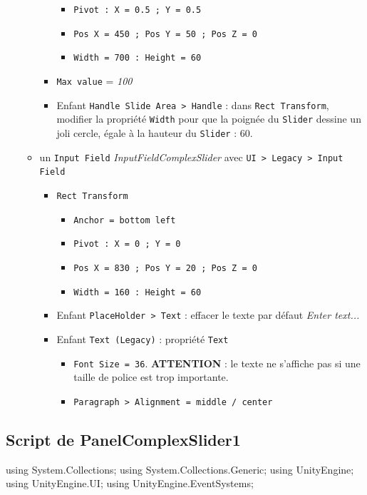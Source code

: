 \documentclass[a4paper,10pt]{article}
\newenvironment{solution}%
{\begin{tcolorbox}[breakable,colback=red!5!white,colframe=red!75!black,title=Solution]}%
{\end{tcolorbox}}
\newenvironment{boxcode}%
{\begin{tcolorbox}[breakable,colback=gray!5!white,colframe=black]}%
	{\end{tcolorbox}}
\begin{document}
\begin{solution}
\begin{itemize}
\begin{itemize}
\begin{itemize}
\begin{itemize}
				\item \texttt{Pivot : X = 0.5 ; Y = 0.5}
				\item \texttt{Pos X = 450 ; Pos Y = 50 ; Pos Z = 0}
				\item \texttt{Width = 700 : Height = 60}				
			\end{itemize}
			\item \texttt{Max value} = \textit{100}
			\item Enfant \texttt{Handle Slide Area > Handle} : dans \texttt{Rect Transform}, modifier la propriété \texttt{Width} pour que la poignée du \texttt{Slider} dessine un joli cercle, égale à la hauteur du \texttt{Slider} : $60$.
		\end{itemize}
		\item un \texttt{Input Field} \textit{InputFieldComplexSlider} avec \texttt{UI > Legacy > Input Field}
		\begin{itemize}
			\item \texttt{Rect Transform}
			\begin{itemize}
				\item \texttt{Anchor = bottom left}
				\item \texttt{Pivot : X = 0 ; Y = 0}
				\item \texttt{Pos X = 830 ; Pos Y = 20 ; Pos Z = 0}
				\item \texttt{Width = 160 : Height = 60}				
			\end{itemize}
			\item Enfant \texttt{PlaceHolder > Text} : effacer le texte par défaut \textit{Enter text...}
			\item Enfant \texttt{Text (Legacy)} : propriété \texttt{Text}
			\begin{itemize}
				\item \texttt{Font Size = 36}. \textbf{ATTENTION} : le texte ne s'affiche pas si une taille de police est trop importante.
				\item \texttt{Paragraph > Alignment = middle / center}
			\end{itemize}
		\end{itemize}
	\end{itemize}
	
\end{itemize}

\subsection{Script de PanelComplexSlider1}

\begin{boxcode}
\begin{csharpsansbord}
using System.Collections;
using System.Collections.Generic;
using UnityEngine;
using UnityEngine.UI;
using UnityEngine.EventSystems;


\end{csharpsansbord}
\end{boxcode}
\end{solution}
\end{document}
